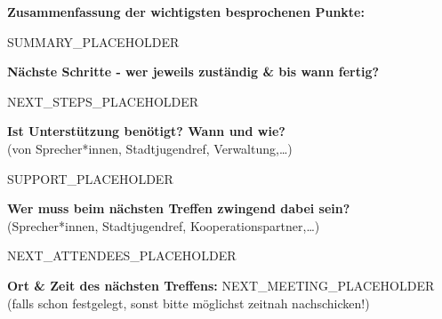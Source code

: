 \documentclass[11pt,a4paper]{article}
\newcommand{\sectionpill}[1]{{\bfseries\color{darkText} #1}}
\begin{document}
\begin{contentbox}
    \sectionpill{Zusammenfassung der wichtigsten besprochenen Punkte:}
    \vspace{2mm}
    
    {{SUMMARY_PLACEHOLDER}}
\end{contentbox}

\vspace{3.5mm plus 1mm minus 1.5mm}

\begin{contentbox}
    \sectionpill{Nächste Schritte - wer jeweils zuständig \& bis wann fertig?}
    \vspace{2mm}
    
    {{NEXT_STEPS_PLACEHOLDER}}
\end{contentbox}

\vspace{3.5mm plus 1mm minus 1.5mm}

\begin{contentbox}
    \sectionpill{Ist Unterstützung benötigt? Wann und wie?}\\[1.5mm]
    {\small\color{subtleText}(von Sprecher*innen, Stadtjugendref, Verwaltung,\dots)}
    \vspace{2mm}
    
    {{SUPPORT_PLACEHOLDER}}
\end{contentbox}

\vspace{3.5mm plus 1mm minus 1.5mm}

\begin{contentbox}
    \sectionpill{Wer muss beim nächsten Treffen zwingend dabei sein?}\\[1.5mm]
    {\small\color{subtleText}(Sprecher*innen, Stadtjugendref, Kooperationspartner,\dots)}
    \vspace{2mm}
    
    {{NEXT_ATTENDEES_PLACEHOLDER}}
\end{contentbox}

\vspace{4mm plus 1mm minus 1.5mm}

\nopagebreak
\noindent
{\textbf{Ort \& Zeit des nächsten Treffens:}} {{NEXT_MEETING_PLACEHOLDER}}\\[1.5mm]
{\small\color{subtleText}(falls schon festgelegt, sonst bitte möglichst zeitnah nachschicken!)}
\end{document}
